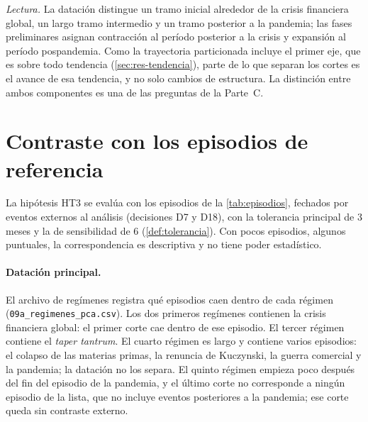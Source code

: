 \emph{Lectura.} La datación distingue un tramo inicial alrededor de la crisis financiera global, un
largo tramo intermedio y un tramo posterior a la pandemia; las fases preliminares asignan
contracción al período posterior a la crisis y expansión al período pospandemia. Como la
trayectoria particionada incluye el primer eje, que es sobre todo tendencia
(\cref{sec:res-tendencia}), parte de lo que separan los cortes es el avance de esa tendencia, y no
solo cambios de estructura. La distinción entre ambos componentes es una de las preguntas de la
Parte~C.


\section{Contraste con los episodios de referencia}
\label{sec:res-validacion}

La hipótesis HT3 se evalúa con los episodios de la \cref{tab:episodios}, fechados por eventos
externos al análisis (decisiones D7 y D18), con la tolerancia principal de 3 meses y la de
sensibilidad de 6 (\cref{def:tolerancia}). Con pocos episodios, algunos puntuales, la
correspondencia es descriptiva y no tiene poder estadístico.

\paragraph{Datación principal.} El archivo de regímenes registra qué episodios caen dentro de cada
régimen (\texttt{09a\_regimenes\_pca.csv}). Los dos primeros regímenes contienen la crisis
financiera global: el primer corte cae dentro de ese episodio. El tercer régimen contiene el
\emph{taper tantrum}. El cuarto régimen es largo y contiene varios episodios: el colapso de las
materias primas, la renuncia de Kuczynski, la guerra comercial y la pandemia; la datación no los
separa. El quinto régimen empieza poco después del fin del episodio de la pandemia, y el último
corte no corresponde a ningún episodio de la lista, que no incluye eventos posteriores a la
pandemia; ese corte queda sin contraste externo.

